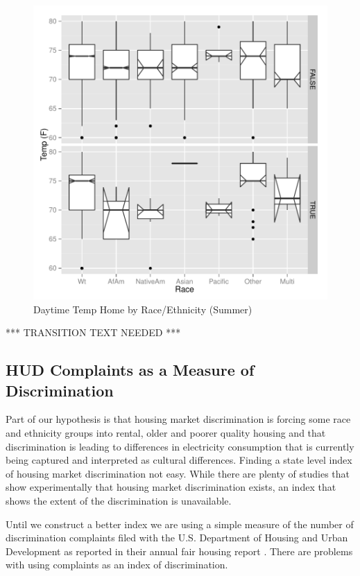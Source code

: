 \documentclass{article}
\begin{document}
\begin{figure}
\begin{center}
\caption{Daytime Temp Home by Race/Ethnicity (Summer)}
\label{fig:HomeRaceS}
\includegraphics{DraftEdwardsWoods-013}
\end{center}
\end{figure}

*** TRANSITION TEXT NEEDED ***

\subsection{HUD Complaints as a Measure of Discrimination}\label{sec:WhyHUD}

Part of our hypothesis is that housing market discrimination is forcing some race and ethnicity groups into rental, older and poorer quality housing and that discrimination is leading to differences in electricity consumption that is currently being captured and interpreted as cultural differences.  Finding a state level index of housing market discrimination not easy.  While there are plenty of studies that show experimentally that housing market discrimination exists, an index that shows the extent of the discrimination is unavailable.

Until we construct a better index we are using a simple measure of the number of discrimination complaints filed with the U.S. Department of Housing and Urban Development as reported in their annual fair housing report \cite{HUD}.  There are problems with using complaints as an index of discrimination.
\end{document}
